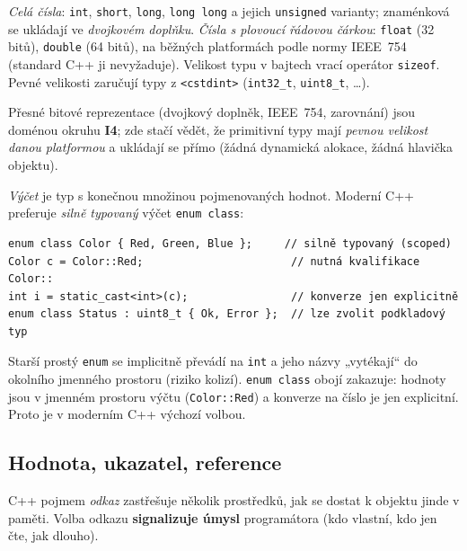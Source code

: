 \documentclass[11pt,a4paper]{article}
\newcommand{\cd}{\lstinline[style=cpp]}
\begin{document}
\begin{definice}
\emph{Celá čísla}: \cd{int}, \cd{short}, \cd{long}, \cd{long long} a jejich \cd{unsigned} varianty; znaménková se ukládají ve \emph{dvojkovém doplňku}. \emph{Čísla s plovoucí řádovou čárkou}: \cd{float} (32 bitů), \cd{double} (64 bitů), na běžných platformách podle normy IEEE~754 (standard C++ ji nevyžaduje). Velikost typu v bajtech vrací operátor \cd{sizeof}. Pevné velikosti zaručují typy z \texttt{<cstdint>} (\cd{int32_t}, \cd{uint8_t}, \ldots).
\end{definice}

\begin{poznamka}
Přesné bitové reprezentace (dvojkový doplněk, IEEE~754, zarovnání) jsou doménou okruhu \textbf{I4}; zde stačí vědět, že primitivní typy mají \emph{pevnou velikost danou platformou} a ukládají se přímo (žádná dynamická alokace, žádná hlavička objektu).
\end{poznamka}

\begin{definice}
\emph{Výčet} je typ s konečnou množinou pojmenovaných hodnot. Moderní C++ preferuje \emph{silně typovaný} výčet \cd{enum class}:
\end{definice}

\begin{lstlisting}[style=cpp]
enum class Color { Red, Green, Blue };     // silně typovaný (scoped)
Color c = Color::Red;                       // nutná kvalifikace Color::
int i = static_cast<int>(c);                // konverze jen explicitně
enum class Status : uint8_t { Ok, Error };  // lze zvolit podkladový typ
\end{lstlisting}

\begin{intuice}
Starší prostý \cd{enum} se implicitně převádí na \cd{int} a jeho názvy „vytékají`` do okolního jmenného prostoru (riziko kolizí). \cd{enum class} obojí zakazuje: hodnoty jsou v jmenném prostoru výčtu (\texttt{Color::Red}) a konverze na číslo je jen explicitní. Proto je v moderním C++ výchozí volbou.
\end{intuice}

\subsection{Hodnota, ukazatel, reference}

C++ pojmem \emph{odkaz} zastřešuje několik prostředků, jak se dostat k objektu jinde v paměti. Volba odkazu \textbf{signalizuje úmysl} programátora (kdo vlastní, kdo jen čte, jak dlouho).
\end{document}
